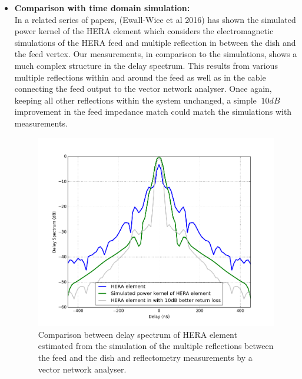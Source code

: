 \documentclass[twocolumn]{emulateapj}
\begin{document}
\begin{itemize}
\item
\textbf{Comparison with time domain simulation: }\\
In a related series of papers, (Ewall-Wice et al 2016) has shown the simulated power kernel of the HERA element which considers the electromagnetic simulations of the HERA feed and multiple reflection in between the dish and the feed vertex. Our measurements, in comparison to the simulations, shows a much complex structure in the delay spectrum. This results from various multiple reflections within and around the feed as well as in the cable connecting the feed output to the vector network analyser. Once again, keeping all other reflections within the system unchanged, a simple $~10dB$ improvement in the feed impedance match could match the simulations with measurements. 


\begin{figure}
\centering
\includegraphics[width=\linewidth]{plots/delay_power.png}
\caption{Comparison between delay spectrum of HERA element estimated from the simulation of the multiple reflections between the feed and the dish and reflectometry measurements by a vector network analyser.}
\label{fig:sim_pk}
\end{figure}





\end{itemize}
\end{document}
